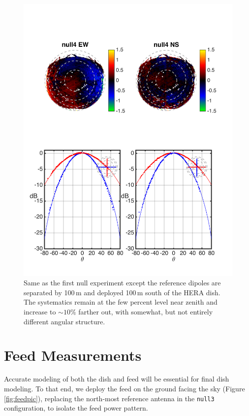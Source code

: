 \documentclass[preprint]{aastex}
\begin{document}
\begin{figure}[h]
\includegraphics[width=6.5in]{null4_rel.png}
\caption{Same as the first null experiment except the reference dipoles are separated by 100\,m and deployed 100\,m south of the HERA dish. The systematics remain at the few percent level near zenith and increase to $\sim10\%$ farther out, with somewhat, but not entirely different angular structure. }
\label{fig:null4}
\end{figure}

\section{Feed Measurements}

Accurate modeling of both the dish and feed will be essential for final dish modeling. To that end, we deploy the feed on the ground facing the sky (Figure \ref{fig:feedpic}), replacing the north-most reference antenna in the \texttt{null3} configuration, to isolate the feed power pattern. 
\end{document}
